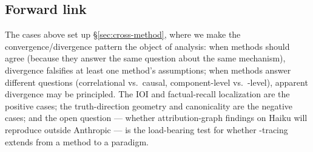 \subsection{Forward link}
\label{sec:circuit-forward}

The cases above set up \S\ref{sec:cross-method}, where we make the
convergence/divergence pattern the object of analysis: when methods
should agree (because they answer the same question about the same
mechanism), divergence falsifies at least one method's assumptions;
when methods answer different questions (correlational vs.\ causal,
component-level vs.\ -level), apparent divergence may be
principled. The IOI  and factual-recall localization are the
positive cases; the truth-direction geometry and  canonicality are
the negative cases; and the open question --- whether attribution-graph
findings on Haiku will reproduce outside Anthropic --- is the load-bearing
test for whether -tracing extends from a method to a paradigm.
